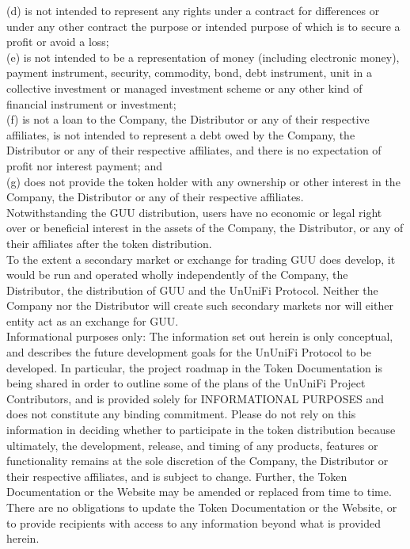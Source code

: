 \documentclass[dvipdfmx]{jsarticle}
\begin{document}
(d)	is not intended to represent any rights under a contract for differences or under any other contract the purpose or intended purpose of which is to secure a profit or avoid a loss;\\
(e)	is not intended to be a representation of money (including electronic money), payment instrument, security, commodity, bond, debt instrument, unit in a collective investment or managed investment scheme or any other kind of financial instrument or investment;\\
(f)	is not a loan to the Company, the Distributor or any of their respective affiliates, is not intended to represent a debt owed by the Company, the Distributor or any of their respective affiliates, and there is no expectation of profit nor interest payment; and\\
(g)	does not provide the token holder with any ownership or other interest in the Company, the Distributor or any of their respective affiliates.\\
Notwithstanding the GUU distribution, users have no economic or legal right over or beneficial interest in the assets of the Company, the Distributor, or any of their affiliates after the token distribution.\\
To the extent a secondary market or exchange for trading GUU does develop, it would be run and operated wholly independently of the Company, the Distributor, the distribution of GUU and the UnUniFi Protocol. Neither the Company nor the Distributor will create such secondary markets nor will either entity act as an exchange for GUU.\\
Informational purposes only: The information set out herein is only conceptual, and describes the future development goals for the UnUniFi Protocol to be developed. In particular, the project roadmap in the Token Documentation is being shared in order to outline some of the plans of the UnUniFi Project Contributors, and is provided solely for INFORMATIONAL PURPOSES and does not constitute any binding commitment. Please do not rely on this information in deciding whether to participate in the token distribution because ultimately, the development, release, and timing of any products, features or functionality remains at the sole discretion of the Company, the Distributor or their respective affiliates, and is subject to change. Further, the Token Documentation or the Website may be amended or replaced from time to time. There are no obligations to update the Token Documentation or the Website, or to provide recipients with access to any information beyond what is provided herein.\\
\end{document}
